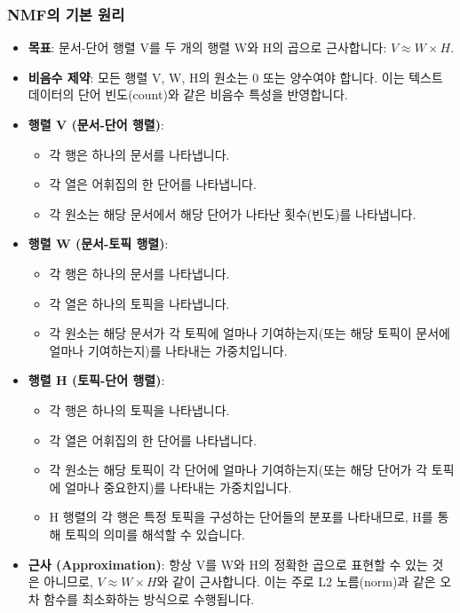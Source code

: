 \documentclass[11pt,a4paper]{article}
\begin{document}
\subsubsection*{NMF의 기본 원리}
\begin{itemize}
    \item \textbf{목표}: 문서-단어 행렬 V를 두 개의 행렬 W와 H의 곱으로 근사합니다: $V \approx W \times H$.
    \item \textbf{비음수 제약}: 모든 행렬 V, W, H의 원소는 0 또는 양수여야 합니다. 이는 텍스트 데이터의 단어 빈도(count)와 같은 비음수 특성을 반영합니다.
    \item \textbf{행렬 V (문서-단어 행렬)}:
    \begin{itemize}
        \item 각 행은 하나의 문서를 나타냅니다.
        \item 각 열은 어휘집의 한 단어를 나타냅니다.
        \item 각 원소는 해당 문서에서 해당 단어가 나타난 횟수(빈도)를 나타냅니다.
    \end{itemize}
    \item \textbf{행렬 W (문서-토픽 행렬)}:
    \begin{itemize}
        \item 각 행은 하나의 문서를 나타냅니다.
        \item 각 열은 하나의 토픽을 나타냅니다.
        \item 각 원소는 해당 문서가 각 토픽에 얼마나 기여하는지(또는 해당 토픽이 문서에 얼마나 기여하는지)를 나타내는 가중치입니다.
    \end{itemize}
    \item \textbf{행렬 H (토픽-단어 행렬)}:
    \begin{itemize}
        \item 각 행은 하나의 토픽을 나타냅니다.
        \item 각 열은 어휘집의 한 단어를 나타냅니다.
        \item 각 원소는 해당 토픽이 각 단어에 얼마나 기여하는지(또는 해당 단어가 각 토픽에 얼마나 중요한지)를 나타내는 가중치입니다.
    \item H 행렬의 각 행은 특정 토픽을 구성하는 단어들의 분포를 나타내므로, H를 통해 토픽의 의미를 해석할 수 있습니다.
    \end{itemize}
    \item \textbf{근사 (Approximation)}: 항상 V를 W와 H의 정확한 곱으로 표현할 수 있는 것은 아니므로, $V \approx W \times H$와 같이 근사합니다. 이는 주로 L2 노름(norm)과 같은 오차 함수를 최소화하는 방식으로 수행됩니다.
\end{itemize}
\end{document}
